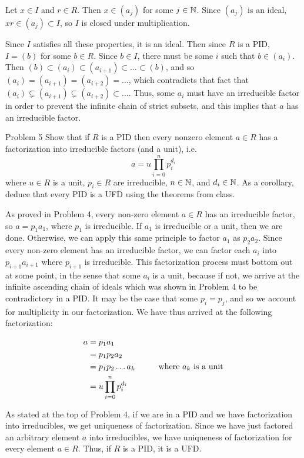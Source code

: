 \documentclass{hmwk}
\begin{document}
\begin{solution}
\pre Let $x \in I$ and $r \in R$. Then $x \in (a_j)$ for some $j \in \mathbb{N}$. Since $(a_j)$ is an ideal, $xr \in (a_j) \subset I$, so $I$ is closed under multiplication. 

\pre Since $I$ satisfies all these properties, it is an ideal. Then since $R$ is a PID, $I = (b)$ for some $b \in R$. Since $b \in I$, there must be some $i$ such that $b \in (a_i)$. Then $(b) \subset (a_i) \subset (a_{i + 1}) \subset \dots \subset (b)$, and so $(a_i) = (a_{i + 1}) = (a_{i + 2}) = \dots$, which contradicts that fact that $(a_i) \subsetneq (a_{i + 1}) \subsetneq (a_{i + 2}) \subset \dots$. 
\pre Thus, some $a_i$ must have an irreducible factor in order to prevent the infinite chain of strict subsets, and this implies that $a$ has an irreducible factor. 
\end{solution}

\begin{problem}{Problem 5}
Show that if $R$ is a PID then every nonzero element $a \in R$ has a factorization into irreducible factors (and a unit), i.e. 
\[a = u \prod_{i =0}^n p_i ^{d_i}\] where $u \in R$ is a unit, $p_i \in R$ are irreducible, $n \in \mathbb{N}$, and $d_i \in \mathbb{N}$.  As a corollary, deduce that every PID is a UFD using the theorems from class.
\end{problem}

\begin{solution}


\pre As proved in Problem 4, every non-zero element $a \in R$ has an irreducible factor, so $a = p_1a_1$, where $p_1$ is irreducible. If $a_1$ is irreducible or a unit, then we are done. Otherwise, we can apply this same principle to factor $a_1$ as $p_2a_2$. Since every non-zero element has an irreducible factor, we can factor each $a_i$ into $p_{i + 1}a_{i + 1}$ where $p_{i + 1}$ is irreducible. This factorization process must bottom out at some point, in the sense that some $a_{i}$ is a unit, because if not, we arrive at the infinite ascending chain of ideals which was shown in Problem 4 to be contradictory in a PID. It may be the case that some $p_{i} = p_{j}$, and so we account for multiplicity in our factorization. We have thus arrived at the following factorization:

\begin{align*}
    a &= p_1a_1 \\
    &= p_1p_2a_2 \\
    &= p_1p_2\dots a_k \text{\hspace{10mm}where $a_k$ is a unit}\\
    &= u\prod_{i=0}^n p_i^{d_i}
\end{align*}

\pre As stated at the top of Problem 4, if we are in a PID and we have factorization into irreducibles, we get uniqueness of factorization. Since we have just factored an arbitrary element $a$ into irreducibles, we have uniqueness of factorization for every element $a \in R$. Thus, if $R$ is a PID, it is a UFD.

\end{solution}
\end{document}
